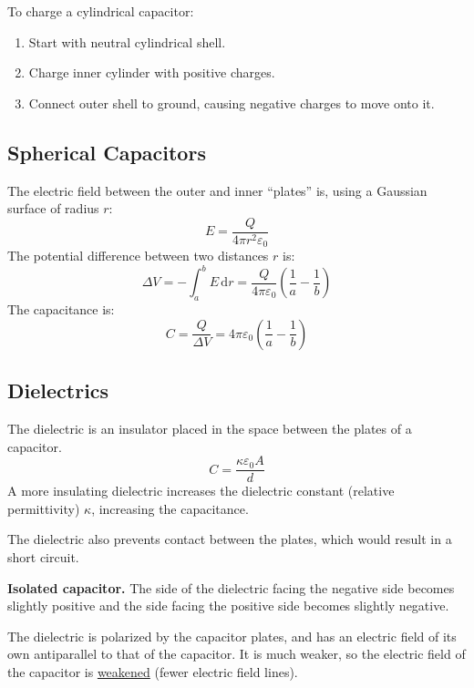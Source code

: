 \documentclass{article}
\begin{document}
To charge a cylindrical capacitor:
\begin{enumerate}
	\item Start with neutral cylindrical shell.
	\item Charge inner cylinder with positive charges.
	\item Connect outer shell to ground, causing negative charges to move onto it.
\end{enumerate}

\subsection{Spherical Capacitors}

The electric field between the outer and inner ``plates'' is, using a Gaussian surface of radius $r$:
\begin{equation*}
    E=\frac{Q}{4\pi r^2\varepsilon_0}
\end{equation*}
The potential difference between two distances $r$ is:
\begin{equation*}
    \Delta V
	=-\int_{a}^{b}E\,\mathrm{d}r
	=\frac{Q}{4\pi \varepsilon_0}\left( \frac{1}{a}-\frac{1}{b} \right)
\end{equation*}
The capacitance is:
\begin{equation*}
    C
	=\frac{Q}{\Delta V}
	=4\pi\varepsilon_0 \left( \frac1a-\frac1b \right)
\end{equation*}

\subsection{Dielectrics}

The dielectric is an insulator placed in the space between the plates of a capacitor.
\begin{equation*}
	C=\frac{\kappa\varepsilon_0 A}{d}
\end{equation*}
A more insulating dielectric increases the dielectric constant (relative permittivity) $\kappa$, increasing the capacitance.

The dielectric also prevents contact between the plates, which would result in a short circuit.

\textbf{Isolated capacitor.} The side of the dielectric facing the negative side becomes slightly positive and the side facing the positive side becomes slightly negative.

The dielectric is polarized by the capacitor plates, and has an electric field of its own antiparallel to that of the capacitor. It is much weaker, so the electric field of the capacitor is \ul{weakened} (fewer electric field lines).
\end{document}
